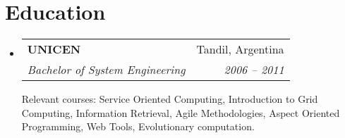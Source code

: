 \documentclass[letterpaper,11pt]{article}
\makeatletter
\newcommand{\resumeSubheadingDescription}[5]{
  \vspace{-1pt}\item
    \begin{tabular*}{0.97\textwidth}[t]{l@{\extracolsep{\fill}}r}
      \textbf{#1} & #2 \\
      \textit{\small#3} & \textit{\small #4} \\
    \end{tabular*}\vspace{1pt}
	\small#5\vspace{-4pt}
}
\newcommand{\resumeSubHeadingListStart}{\begin{itemize}[leftmargin=*]}
\newcommand{\resumeSubHeadingListEnd}{\end{itemize}}
\makeatother
\begin{document}
\section{Education}
  \resumeSubHeadingListStart
    \resumeSubheadingDescription
      {UNICEN}{Tandil, Argentina}
      {Bachelor of System Engineering}{2006 -- 2011}
      {Relevant courses: Service Oriented Computing, Introduction to Grid Computing, Information Retrieval, Agile Methodologies, Aspect Oriented Programming, Web Tools, Evolutionary computation.}
  \resumeSubHeadingListEnd
\end{document}
